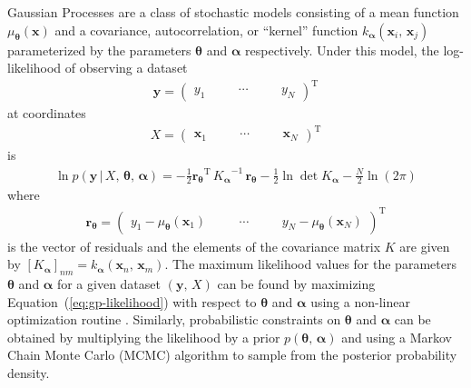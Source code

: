\documentclass[manuscript, letterpaper]{aastex6}
\makeatletter
\let\origsection\section
\renewcommand\section{\@ifstar{\starsection}{\nostarsection}}
\newcommand\nostarsection[1]{\sectionprelude\origsection{#1}}
\newcommand\starsection[1]{\sectionprelude\origsection*{#1}}
\newcommand\sectionprelude{\vspace{1em}}
\renewcommand{\eqref}[1]{\ref{eq:#1}}
\newcommand{\Eq}[1]{Equation~(\eqref{#1})}
\newcommand{\eq}[1]{\Eq{#1}}
\newcommand{\eqlabel}[1]{\label{eq:#1}}
\newcommand{\sectlabel}[1]{\label{sect:#1}}
\newcommand{\T}{\ensuremath{\mathrm{T}}}
\newcommand{\bvec}[1]{{\ensuremath{\boldsymbol{#1}}}}
\makeatother
\begin{document}
\section{Gaussian processes}\sectlabel{gps}

Gaussian Processes \citep[GPs;][]{Rasmussen:2006} are a class of stochastic
models consisting of a mean function $\mu_\bvec{\theta}(\bvec{x})$ and a
covariance, autocorrelation, or ``kernel'' function
$k_\bvec{\alpha}(\bvec{x}_i,\,\bvec{x}_j)$ parameterized by the parameters
$\bvec{\theta}$ and $\bvec{\alpha}$ respectively.
Under this model, the log-likelihood of observing a dataset
\begin{eqnarray}
\bvec{y} = \left(\begin{array}{ccccc}
    y_1\quad && \cdots\quad && y_N
\end{array}\right)^\T
\end{eqnarray}
at coordinates
\begin{eqnarray}
X = \left(\begin{array}{ccccc}
    \bvec{x}_1\quad && \cdots\quad && \bvec{x}_N
\end{array}\right)^\T
\end{eqnarray}
is
\begin{eqnarray}\eqlabel{gp-likelihood}
\ln{p(\bvec{y}\,|\,{X,\,\bvec{\theta}},\,\bvec{\alpha})} =
    -\frac{1}{2} {\bvec{r}_\bvec{\theta}}^\T\,{K_\bvec{\alpha}}^{-1}\,
        \bvec{r}_\bvec{\theta}
    -\frac{1}{2}\ln\det K_\bvec{\alpha}
    - \frac{N}{2} \ln{(2\pi)}
\end{eqnarray}
where
\begin{eqnarray}
    \bvec{r}_\bvec{\theta} = \left(\begin{array}{ccccc}
    y_1 - \mu_\bvec{\theta}(\bvec{x}_1)\quad && \cdots\quad &&
    y_N - \mu_\bvec{\theta}(\bvec{x}_N)
\end{array}\right)^\T
\end{eqnarray}
is the vector of residuals and the elements of the covariance matrix $K$ are
given by $[K_\bvec{\alpha}]_{nm} = k_\bvec{\alpha}(\bvec{x}_n,\,\bvec{x}_m)$.
The maximum likelihood values for the parameters $\bvec{\theta}$ and
$\bvec{\alpha}$ for a given dataset $(\bvec{y},\,X)$ can be found by
maximizing \eq{gp-likelihood} with respect to $\bvec{\theta}$ and
$\bvec{\alpha}$ using a non-linear optimization routine \citep{Nocedal:2006}.
Similarly, probabilistic constraints on $\bvec{\theta}$ and $\bvec{\alpha}$
can be obtained by multiplying the likelihood by a prior
$p(\bvec{\theta},\,\bvec{\alpha})$ and using a Markov Chain Monte Carlo (MCMC)
algorithm to sample from the posterior probability density.
\end{document}
